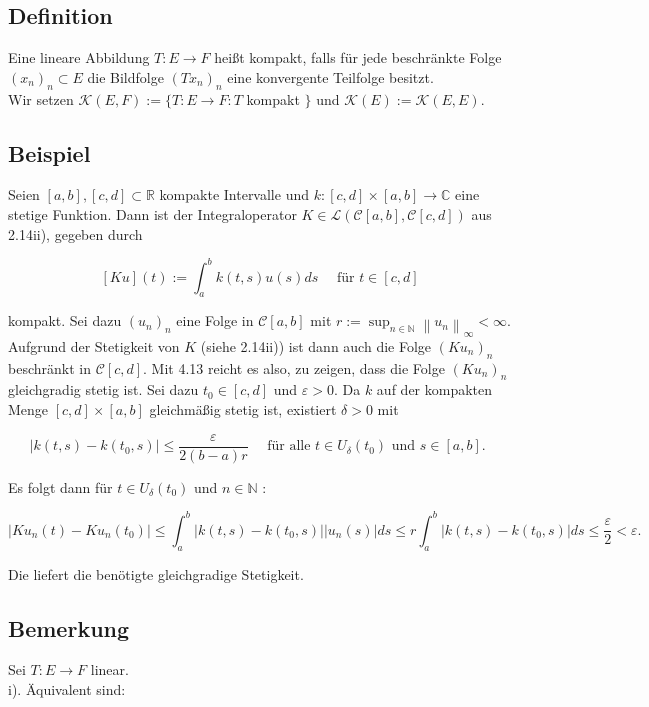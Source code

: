 \documentclass[10pt, letterpaper]{article}
\begin{document}
\subsection*{Definition}
Eine lineare Abbildung $T: E \rightarrow F$ heißt kompakt, falls für jede beschränkte Folge $\left(x_{n}\right)_{n} \subset E$ die Bildfolge $\left(T x_{n}\right)_{n}$ eine konvergente Teilfolge besitzt.\\
Wir setzen $\mathcal{K}(E, F):=\{T: E \rightarrow F: T$ kompakt $\}$ und $\mathcal{K}(E):=\mathcal{K}(E, E)$.

\subsection*{Beispiel}
Seien $[a, b],[c, d] \subset \mathbb{R}$ kompakte Intervalle und $k:[c, d] \times[a, b] \rightarrow \mathbb{C}$ eine stetige Funktion. Dann ist der Integraloperator $K \in \mathcal{L}(\mathcal{C}[a, b], \mathcal{C}[c, d])$ aus 2.14ii), gegeben durch

$$
[K u](t):=\int_{a}^{b} k(t, s) u(s) d s \quad \text { für } t \in[c, d]
$$

kompakt. Sei dazu $\left(u_{n}\right)_{n}$ eine Folge in $\mathcal{C}[a, b]$ mit $r:=\sup _{n \in \mathbb{N}}\left\|u_{n}\right\|_{\infty}<\infty$. Aufgrund der Stetigkeit von $K$ (siehe 2.14ii)) ist dann auch die Folge $\left(K u_{n}\right)_{n}$ beschränkt in $\mathcal{C}[c, d]$. Mit 4.13 reicht es also, zu zeigen, dass die Folge $\left(K u_{n}\right)_{n}$ gleichgradig stetig ist. Sei dazu $t_{0} \in[c, d]$ und $\varepsilon>0$. Da $k$ auf der kompakten Menge $[c, d] \times[a, b]$ gleichmäßig stetig ist, existiert $\delta>0$ mit

$$
\left|k(t, s)-k\left(t_{0}, s\right)\right| \leq \frac{\varepsilon}{2(b-a) r} \quad \text { für alle } t \in U_{\delta}\left(t_{0}\right) \text { und } s \in[a, b] \text {. }
$$

Es folgt dann für $t \in U_{\delta}\left(t_{0}\right)$ und $n \in \mathbb{N}$ :

$$
\left|K u_{n}(t)-K u_{n}\left(t_{0}\right)\right| \leq \int_{a}^{b}\left|k(t, s)-k\left(t_{0}, s\right)\right|\left|u_{n}(s)\right| d s \leq r \int_{a}^{b}\left|k(t, s)-k\left(t_{0}, s\right)\right| d s \leq \frac{\varepsilon}{2}<\varepsilon .
$$

Die liefert die benötigte gleichgradige Stetigkeit.

\subsection*{Bemerkung}
Sei $T: E \rightarrow F$ linear.\\
i). Äquivalent sind:
\end{document}
